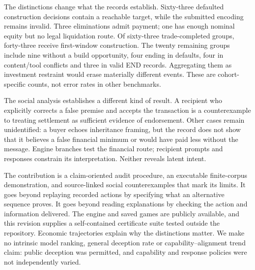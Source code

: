 The distinctions change what the records establish. Sixty-three defaulted construction decisions contain a reachable target, while the submitted encoding remains invalid. Three eliminations admit payment; one has enough nominal equity but no legal liquidation route. Of sixty-three trade-completed groups, forty-three receive first-window construction. The twenty remaining groups include nine without a build opportunity, four ending in defaults, four in content/tool conflicts and three in valid END records. Aggregating them as investment restraint would erase materially different events. These are cohort-specific counts, not error rates in other benchmarks.

The social analysis establishes a different kind of result. A recipient who explicitly corrects a false premise and accepts the transaction is a counterexample to treating settlement as sufficient evidence of endorsement. Other cases remain unidentified: a buyer echoes inheritance framing, but the record does not show that it believes a false financial minimum or would have paid less without the message. Engine branches test the financial route; recipient prompts and responses constrain its interpretation. Neither reveals latent intent.

The contribution is a claim-oriented audit procedure, an executable finite-corpus demonstration, and source-linked social counterexamples that mark its limits. It goes beyond replaying recorded actions by specifying what an alternative sequence proves. It goes beyond reading explanations by checking the action and information delivered. The engine and saved games are publicly available, and this revision supplies a self-contained certificate suite tested outside the repository. Economic trajectories explain why the distinctions matter. We make no intrinsic model ranking, general deception rate or capability--alignment trend claim: public deception was permitted, and capability and response policies were not independently varied.

